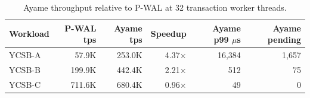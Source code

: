 \begin{table}[t]
  \centering
  \caption{Ayame throughput relative to P-WAL at 32 transaction worker threads.}
  \label{tab:ayame-speedup-32worker}
  \small
  \setlength{\tabcolsep}{6pt}
  \begin{tabular}{lrrrrr}
    \hline
    Workload & P-WAL tps & Ayame tps & Speedup & Ayame p99 $\mu$s & Ayame pending \\
    \hline
    YCSB-A & 57.9K & 253.0K & 4.37$\times$ & 16,384 & 1,657 \\
    YCSB-B & 199.9K & 442.4K & 2.21$\times$ & 512 & 75 \\
    YCSB-C & 711.6K & 680.4K & 0.96$\times$ & 49 & 0 \\
    \hline
  \end{tabular}
\end{table}
